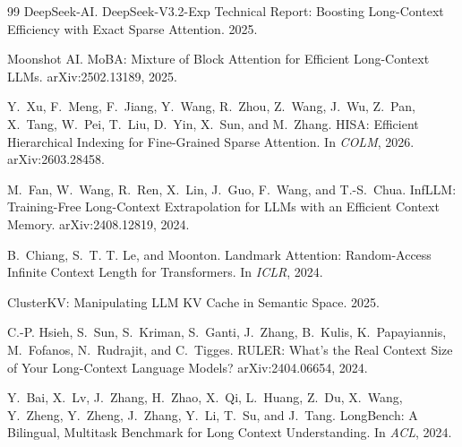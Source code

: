 \documentclass[11pt]{article}
\begin{document}
\begin{thebibliography}{99}
DeepSeek-AI. DeepSeek-V3.2-Exp Technical Report: Boosting Long-Context Efficiency with Exact Sparse Attention. 2025.

Moonshot AI. MoBA: Mixture of Block Attention for Efficient Long-Context LLMs. arXiv:2502.13189, 2025.

Y.~Xu, F.~Meng, F.~Jiang, Y.~Wang, R.~Zhou, Z.~Wang, J.~Wu, Z.~Pan, X.~Tang, W.~Pei, T.~Liu, D.~Yin, X.~Sun, and M.~Zhang. HISA: Efficient Hierarchical Indexing for Fine-Grained Sparse Attention. In \emph{COLM}, 2026. arXiv:2603.28458.

M.~Fan, W.~Wang, R.~Ren, X.~Lin, J.~Guo, F.~Wang, and T.-S.~Chua. InfLLM: Training-Free Long-Context Extrapolation for LLMs with an Efficient Context Memory. arXiv:2408.12819, 2024.

B.~Chiang, S.~T. T. Le, and Moonton. Landmark Attention: Random-Access Infinite Context Length for Transformers. In \emph{ICLR}, 2024.

ClusterKV: Manipulating LLM KV Cache in Semantic Space. 2025.

C.-P. Hsieh, S.~Sun, S.~Kriman, S.~Ganti, J.~Zhang, B.~Kulis, K.~Papayiannis, M.~Fofanos, N.~Rudrajit, and C.~Tigges. RULER: What's the Real Context Size of Your Long-Context Language Models? arXiv:2404.06654, 2024.

Y.~Bai, X.~Lv, J.~Zhang, H.~Zhao, X.~Qi, L.~Huang, Z.~Du, X.~Wang, Y.~Zheng, Y.~Zheng, J.~Zhang, Y.~Li, T.~Su, and J.~Tang. LongBench: A Bilingual, Multitask Benchmark for Long Context Understanding. In \emph{ACL}, 2024.
\end{thebibliography}
\end{document}
